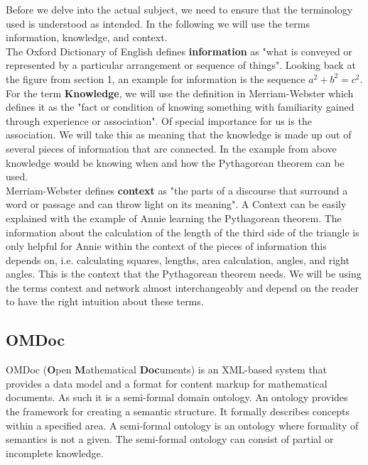 \documentclass[twoside]{article}
\begin{document}
Before we delve into the actual subject, we need to ensure that the terminology used is understood as intended. In the following we will use the terms information, knowledge, and context.\\

The Oxford Dictionary of English \cite{OED:npentrel14} defines \textbf{information} as "what is conveyed or represented by a particular arrangement or sequence of things". Looking back at the figure from section 1, an example for information is the sequence \textit{$a^2 + b^2 = c^2$}. For the term \textbf{Knowledge}, we will use the definition in Merriam-Webster \cite{Webster:npentrel14} which defines it as the "fact or condition of knowing something with familiarity gained through experience or association". Of special importance for us is the association. We will take this as meaning that the knowledge is made up out of several pieces of information that are connected. In the example from above knowledge would be knowing when and how the Pythagorean theorem can be used.\\ 

Merriam-Webster \cite{Webster:npentrel14} defines \textbf{context} as "the parts of a discourse that surround a word or passage and can throw light on its meaning". A Context can be easily explained with the example of Annie learning the Pythagorean theorem. The information about the calculation of the length of the third side of the triangle is only helpful for Annie within the context of the pieces of information this depends on, i.e. calculating squares, lengths, area calculation, angles, and right angles. This is the context that the Pythagorean theorem needs. We will be using the terms context and network almost interchangeably and depend on the reader to have the right intuition about these terms.\\

\subsection{OMDoc}
\label{sec:OMDoc}

OMDoc (\textbf{O}pen \textbf{M}athematical \textbf{Doc}uments) \cite{Kohlhase:OMDoc1.2} is an XML-based system that provides a data model and a format for content markup for mathematical documents. As such it is a semi-formal domain ontology. An ontology provides the framework for creating a semantic structure. It formally describes concepts within a specified area. A semi-formal ontology \cite{Sheth:npentrel14} is an ontology where formality of semantics is not a given. The semi-formal ontology can consist of partial or incomplete knowledge. \\
\end{document}
